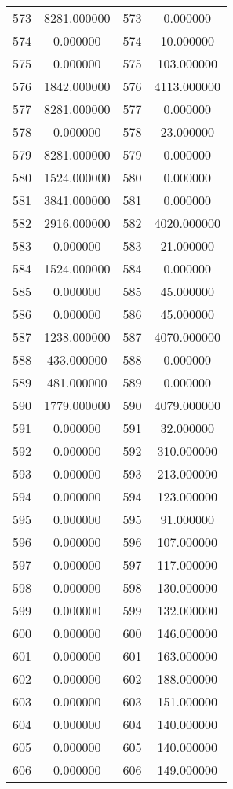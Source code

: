 \documentclass[12pt]{article}
\begin{document}
\begin{longtable}{@{}cccc@{}}
573 & 8281.000000 & 573 & 0.000000 \\
574 & 0.000000 & 574 & 10.000000 \\
575 & 0.000000 & 575 & 103.000000 \\
576 & 1842.000000 & 576 & 4113.000000 \\
577 & 8281.000000 & 577 & 0.000000 \\
578 & 0.000000 & 578 & 23.000000 \\
579 & 8281.000000 & 579 & 0.000000 \\
580 & 1524.000000 & 580 & 0.000000 \\
581 & 3841.000000 & 581 & 0.000000 \\
582 & 2916.000000 & 582 & 4020.000000 \\
583 & 0.000000 & 583 & 21.000000 \\
584 & 1524.000000 & 584 & 0.000000 \\
585 & 0.000000 & 585 & 45.000000 \\
586 & 0.000000 & 586 & 45.000000 \\
587 & 1238.000000 & 587 & 4070.000000 \\
588 & 433.000000 & 588 & 0.000000 \\
589 & 481.000000 & 589 & 0.000000 \\
590 & 1779.000000 & 590 & 4079.000000 \\
591 & 0.000000 & 591 & 32.000000 \\
592 & 0.000000 & 592 & 310.000000 \\
593 & 0.000000 & 593 & 213.000000 \\
594 & 0.000000 & 594 & 123.000000 \\
595 & 0.000000 & 595 & 91.000000 \\
596 & 0.000000 & 596 & 107.000000 \\
597 & 0.000000 & 597 & 117.000000 \\
598 & 0.000000 & 598 & 130.000000 \\
599 & 0.000000 & 599 & 132.000000 \\
600 & 0.000000 & 600 & 146.000000 \\
601 & 0.000000 & 601 & 163.000000 \\
602 & 0.000000 & 602 & 188.000000 \\
603 & 0.000000 & 603 & 151.000000 \\
604 & 0.000000 & 604 & 140.000000 \\
605 & 0.000000 & 605 & 140.000000 \\
606 & 0.000000 & 606 & 149.000000 \\

\end{longtable}
\end{document}
